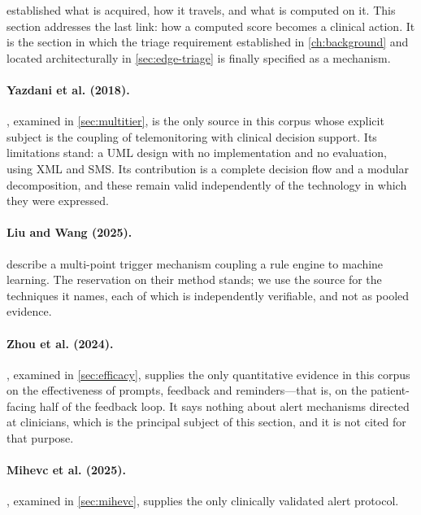 \documentclass[12pt,a4paper,oneside]{report}
\begin{document}
 established what is acquired, how it travels, and what is computed on it. This section addresses the last link: how a computed score becomes a clinical action. It is the section in which the triage requirement established in \cref{ch:background} and located architecturally in \cref{sec:edge-triage} is finally specified as a mechanism.

\paragraph{Yazdani et al. (2018).} \textcite{yazdani2018}, examined in \cref{sec:multitier}, is the only source in this corpus whose explicit subject is the coupling of telemonitoring with clinical decision support. Its limitations stand: a UML design with no implementation and no evaluation, using XML and SMS. Its contribution is a complete decision flow and a modular decomposition, and these remain valid independently of the technology in which they were expressed.

\paragraph{Liu and Wang (2025).} \textcite{liu2025review} describe a multi-point trigger mechanism coupling a rule engine to machine learning. The reservation on their method stands; we use the source for the techniques it names, each of which is independently verifiable, and not as pooled evidence.

\paragraph{Zhou et al. (2024).} \textcite{zhou2024}, examined in \cref{sec:efficacy}, supplies the only quantitative evidence in this corpus on the effectiveness of prompts, feedback and reminders---that is, on the patient-facing half of the feedback loop. It says nothing about alert mechanisms directed at clinicians, which is the principal subject of this section, and it is not cited for that purpose.

\paragraph{Mihevc et al. (2025).} \textcite{mihevc2025}, examined in \cref{sec:mihevc}, supplies the only clinically validated alert protocol.

\end{document}

